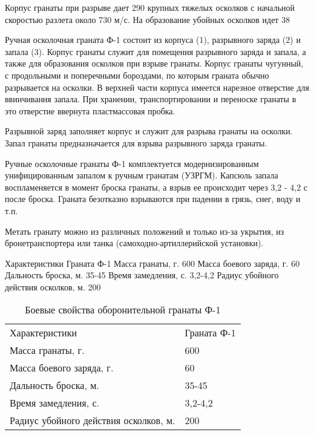 \documentclass[12pt,a4paper]{report}
\begin{document}
Корпус гранаты при разрыве дает 290 крупных тяжелых осколков с начальной скоростью разлета около 730 м/с.
На образование убойных осколков идет 38%

Ручная осколочная граната Ф-1 состоит из корпуса (1), разрывного заряда (2) и запала (3). Корпус гранаты служит для помещения разрывного заряда и запала, а также для образования осколков при взрыве гранаты. Корпус гранаты чугунный, с продольными и поперечными бороздами, по которым граната обычно разрывается на осколки. В верхней части корпуса имеется нарезное отверстие для ввинчивания запала. При хранении, транспортировании и переноске гранаты в это отверстие ввернута пластмассовая пробка.

Разрывной заряд заполняет корпус и служит для разрыва гранаты на осколки. Запал гранаты предназначается для взрыва разрывного заряда гранаты.

Ручные осколочные гранаты Ф-1 комплектуется модернизированным унифицированным запалом к ручным гранатам (УЗРГМ). Капсюль запала воспламеняется в момент броска гранаты, а взрыв ее происходит через 3,2 - 4,2 с после броска. Граната безотказно взрываются при падении в грязь, снег, воду и т.п.

Метать гранату можно из различных положений и только из-за укрытия, из бронетранспортера или танка (самоходно-артиллерийской установки).

Характеристики	Граната Ф-1
Масса гранаты, г.	600
Масса боевого заряда, г.	60
Дальность броска, м.	35-45
Время замедления, с.	3,2-4,2
Радиус убойного действия осколков, м.	200
\begin{table}[h!]
	\caption{Боевые свойства оборонительной гранаты Ф-1}
	\label{tabular:F1}
	\begin{center}
		\begin{tabular}{|l|l|}
			\hline
			\rowcolor[gray]{.9} Характеристики &  Граната Ф-1\\
			Масса гранаты, г.	& 600\\
			Масса боевого заряда, г.	& 60\\
			Дальность броска, м.	& 35-45\\
			Время замедления, с.	& 3,2-4,2\\
			Радиус убойного действия осколков, м.	& 200\\
			\hline
		\end{tabular}
	\end{center}
\end{table}
\end{document}
